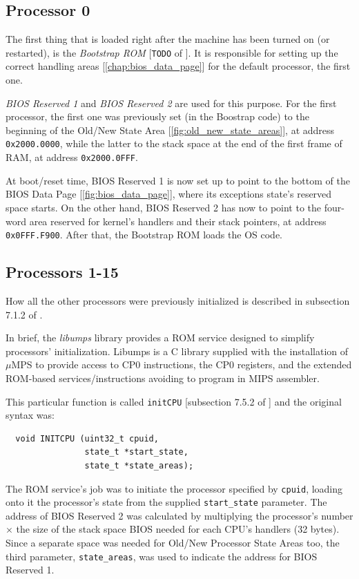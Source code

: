 \documentclass[12pt,a4paper,openright,twoside]{report}
\begin{document}
\subsection{Processor 0}
The first thing that is loaded right after the machine has been turned on (or restarted), is the \textit{Bootstrap ROM} [\texttt{TODO} of \cite{pops}].
It is responsible for setting up the correct handling areas [\autoref{chap:bios_data_page}] for the default processor, the first one.

\textit{BIOS Reserved 1} and \textit{BIOS Reserved 2} are used for this purpose.
For the first processor, the first one was previously set (in the Boostrap code) to the beginning of the Old/New State Area [\autoref{fig:old_new_state_areas}], at address \texttt{0x2000.0000}, while the latter to the stack space at the end of the first frame of RAM, at address \texttt{0x2000.0FFF}.

At boot/reset time, BIOS Reserved 1 is now set up to point to the bottom of the BIOS Data Page [\autoref{fig:bios_data_page}], where its exceptions state's reserved space starts.
On the other hand, BIOS Reserved 2 has now to point to the four-word area reserved for kernel's handlers and their stack pointers, at address \texttt{0x0FFF.F900}. After that, the Bootstrap ROM loads the OS code.

\subsection{Processors 1-15}
How all the other processors were previously initialized is described in subsection 7.1.2 of \cite{old_pops}.

In brief, the \textit{libumps} library provides a ROM service designed to simplify processors' initialization.
Libumps is a C library supplied with the installation of $\mu$MPS to provide access to CP0 instructions, the CP0 registers, and the extended ROM-based services/instructions avoiding to program in MIPS assembler.

This particular function is called \texttt{initCPU} [subsection 7.5.2 of \cite{old_pops}] and the original syntax was:
\begin{verbatim}
  void INITCPU (uint32_t cpuid,
                state_t *start_state,
                state_t *state_areas);
\end{verbatim}

The ROM service's job was to initiate the processor specified by \texttt{cpuid}, loading onto it the processor's state from the supplied \texttt{start\_state} parameter.
The address of BIOS Reserved 2 was calculated by multiplying the processor's number $\times$ the size of the stack space BIOS needed for each CPU's handlers (32 bytes).
Since a separate space was needed for Old/New Processor State Areas too, the third parameter, \texttt{state\_areas}, was used to indicate the address for BIOS Reserved 1.
\end{document}
